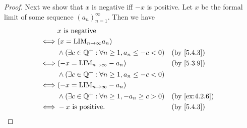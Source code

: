 \begin{proof}
	Next we show that \(x\) is negative iff \(-x\) is positive.
	Let \(x\) be the formal limit of some sequence \((a_n)_{n = 1}^{\infty}\).
	Then we have
	\begin{align*}
		     & x \text{ is negative}                                                             \\
		\iff & (x = \text{LIM}_{n \to \infty} a_n)                                               \\
		     & \land (\exists c \in \Q^+ : \forall n \geq 1, a_n \leq -c < 0) &  & \by{5.4.3}    \\
		\iff & (-x = \text{LIM}_{n \to \infty} -a_n)                          &  & \by{5.3.9}    \\
		     & \land (\exists c \in \Q^+ : \forall n \geq 1, a_n \leq -c < 0)                    \\
		\iff & (-x = \text{LIM}_{n \to \infty} -a_n)                                             \\
		     & \land (\exists c \in \Q^+ : \forall n \geq 1, -a_n \geq c > 0) &  & \by{ex:4.2.6} \\
		\iff & -x \text{ is positive}.                                        &  & \by{5.4.3}
	\end{align*}


\end{proof}

